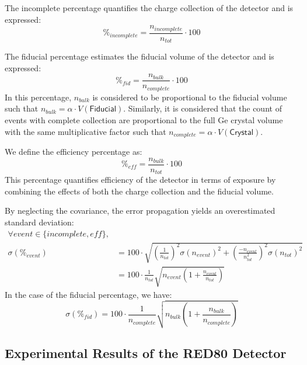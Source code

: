 The incomplete percentage quantifies the charge collection of the detector and is expressed:
\begin{equation}
\%_{incomplete}
=
\frac{n_{incomplete}}{n_{tot}} \cdot 100
\end{equation}

The fiducial percentage estimates the fiducial volume of the detector and is expressed:
\begin{equation}
\%_{fid}
=
\frac{n_{bulk}}{n_{complete}} \cdot 100
\end{equation}
In this percentage, $n_{bulk}$ is considered to be proportional to the fiducial volume such that $n_{bulk} = \alpha \cdot V(\textsf{Fiducial})$. Similarly, it is considered that the count of events with complete collection are proportional to the full Ge crystal volume with the same multiplicative factor such that $n_{complete} = \alpha \cdot V(\textsf{Crystal})$.

We define the efficiency percentage as:
\begin{equation}
\%_{eff}
=
\frac{n_{bulk}}{n_{tot}} \cdot 100
\end{equation}
This percentage quantifies efficiency of the detector in terms of exposure by combining the effects of both the charge collection and the fiducial volume.


By neglecting the covariance, the error propagation yields an overestimated standard deviation:
\begin{equation}
\begin{split}
\forall event \in \{ incomplete, eff \}, & \\
\sigma (\%_{event})
&=
100 \cdot
\sqrt{
\left( \frac{1}{n_{tot}} \right)^2 \sigma(n_{event})^2
+
\left( \frac{-n_{event}}{n_{tot}^2} \right)^2 \sigma(n_{tot})^2
}
\\
&=
100 \cdot
\frac{1}{n_{tot}}
\sqrt{ 
n_{event} \left( 1 + \frac{n_{event}}{n_{tot}} \right)
}
\end{split}
\end{equation}
In the case of the fiducial percentage, we have:
\begin{equation}
\sigma (\%_{fid})
=
100 \cdot
\frac{1}{n_{complete}}
\sqrt{ 
n_{bulk} \left( 1 + \frac{n_{bulk}}{n_{complete}} \right)
}
\end{equation}

\subsection{Experimental Results of the RED80 Detector}

